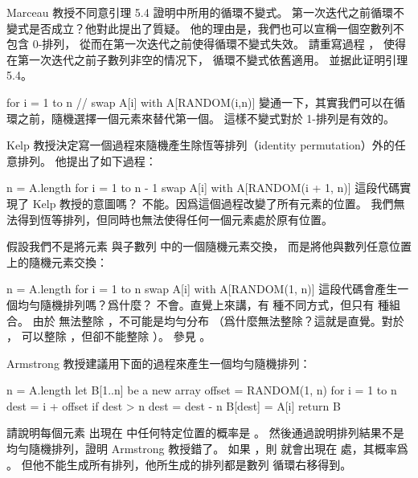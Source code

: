 \startsection[
  title={Randomized algorithms},
]

\startEXERCISE
Marceau 教授不同意引理 5.4 證明中所用的循環不變式。
第一次迭代之前循環不變式是否成立？他對此提出了質疑。
他的理由是，我們也可以宣稱一個空數列不包含 0-排列，
從而在第一次迭代之前使得循環不變式失效。
請重寫過程 ，
使得在第一次迭代之前子數列非空的情况下，
循環不變式依舊適用。
並据此证明引理 5.4。


\startCLRSCODE
for i = 1 to n
	// swap A[i] with A[RANDOM(i,n)]
\stopCLRSCODE
\stopEXERCISE
\startANSWER
變通一下，其實我們可以在循環之前，隨機選擇一個元素來替代第一個。
這樣不變式對於 1-排列是有效的。
\stopANSWER

\startEXERCISE
Kelp 教授決定寫一個過程來隨機產生除恆等排列（identity permutation）外的任意排列。
他提出了如下過程：

\startCLRS
n = A.length
for i = 1 to n - 1
	swap A[i] with A[RANDOM(i + 1, n)]
\stopCLRS
這段代碼實現了 Kelp 教授的意圖嗎？
\stopEXERCISE
\startANSWER
不能。因爲這個過程改變了所有元素的位置。
我們無法得到恆等排列，但同時也無法使得任何一個元素處於原有位置。
\stopANSWER

\startEXERCISE
假設我們不是將元素  與子數列  中的一個隨機元素交換，
而是將他與數列任意位置上的隨機元素交換：

\startCLRS
n = A.length
for i = 1 to n
	swap A[i] with A[RANDOM(1, n)]
\stopCLRS
這段代碼會產生一個均勻隨機排列嗎？爲什麼？
\stopEXERCISE
\startANSWER
不會。直覺上來講，有  種不同方式，但只有  種組合。
由於  無法整除 ，不可能是均勻分布
（爲什麼無法整除？這就是直覺。對於 ，  可以整除 ，但卻不能整除 ）。
參見 。
\stopANSWER

\startEXERCISE
Armstrong 教授建議用下面的過程來產生一個均勻隨機排列：

\startCLRS
n = A.length
let B[1..n] be a new array
offset = RANDOM(1, n)
for i = 1 to n
	dest = i + offset
	if dest > n
		dest = dest - n
	B[dest] = A[i]
return B
\stopCLRS

請說明每個元素  出現在  中任何特定位置的概率是 。
然後通過說明排列結果不是均勻隨機排列，證明 Armstrong 教授錯了。
\stopEXERCISE
\startANSWER
如果 ，則  就會出現在  處，其概率爲 。
但他不能生成所有排列，他所生成的排列都是數列  循環右移得到。
\stopANSWER

